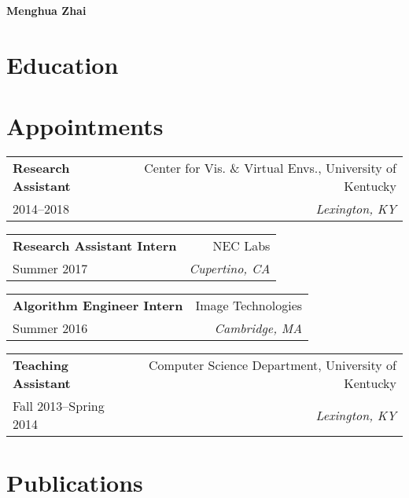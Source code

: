 \setlength{\parindent}{0pt}
\pagestyle{empty}

\begin{center}
    {\Huge \textbf{Menghua Zhai}}
\end{center}

\hrulefill 
\vspace{0.04in}

\section*{Education}


\section*{Appointments}
    
    \newcommand{\appointment}[4]{
      \begin{tabular*}{\textwidth}[t]{l@{\extracolsep{\fill}}r}
        \textbf{#1} & {#2} \\
        {#3} & \textit{#4}
      \end{tabular*}
    }

    \appointment 
      {Research Assistant}
      {Center for Vis. \& Virtual Envs., University of Kentucky}
      {2014--2018}
      {Lexington, KY}
    
    \appointment
      {Research Assistant Intern}
      {NEC Labs}
      {Summer 2017}
      {Cupertino, CA}

    \appointment
      {Algorithm Engineer Intern}
      {Image Technologies}
      {Summer 2016}
      {Cambridge, MA}

    \appointment
      {Teaching Assistant}
      {Computer Science Department, University of Kentucky}
      {Fall 2013--Spring 2014}
      {Lexington, KY}
    
\section*{Publications}

    \renewcommand\bibsection{\vspace{-.5em}\subsection*{\refname}}

